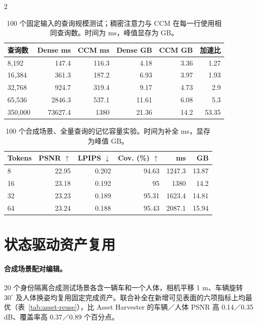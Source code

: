 \begin{multicols}{2}
\begin{table}[H]
\centering\small
\setlength{\tabcolsep}{3pt}
\caption{100 个固定输入的查询规模测试；稠密注意力与 CCM 在每一行使用相同查询数。时间为 ms，峰值显存为 GB。}
\label{tab:attention-scaling}
\begin{tabular}{@{}lrrrrr@{}}
\toprule
查询数 & Dense ms & CCM ms & Dense GB & CCM GB & 加速比 \\
\midrule
8,192 & 147.4 & 116.3 & 4.18 & 3.36 & 1.27 \\
16,384 & 361.3 & 187.2 & 6.93 & 3.97 & 1.93 \\
32,768 & 924.7 & 319.4 & 9.17 & 4.73 & 2.9 \\
65,536 & 2846.3 & 537.1 & 11.61 & 6.08 & 5.3 \\
350,000 & 73627.4 & 1380 & 21.36 & 14.2 & 53.35 \\
\bottomrule
\end{tabular}
\end{table}

\begin{table}[H]
\centering\small
\setlength{\tabcolsep}{4pt}
\caption{100 个合成场景、全量查询的记忆容量实验。时间为补全 ms，显存为峰值 GB。}
\label{tab:memory-capacity}
\begin{tabular}{@{}lrrrrr@{}}
\toprule
Tokens & PSNR $\uparrow$ & LPIPS $\downarrow$ & Cov. (\%) $\uparrow$ & ms & GB \\
\midrule
8 & 22.95 & 0.202 & 94.63 & 1247.3 & 13.87 \\
16 & 23.18 & 0.192 & 95 & 1380 & 14.2 \\
32 & 23.23 & 0.189 & 95.31 & 1623.4 & 14.81 \\
64 & 23.24 & 0.188 & 95.43 & 2087.1 & 15.94 \\
\bottomrule
\end{tabular}
\end{table}

\section{状态驱动资产复用}
\label{sec:supp-reuse}

\paragraph{合成场景配对编辑。}
20 个身份隔离合成测试场景各含一辆车和一个人体，相机平移 1 m、车辆旋转 $30^\circ$ 及人体换姿均复用固定完成资产。联合补全在新增可见表面的六项指标上均最优（表~\ref{tab:asset-reuse}），比 Asset Harvester 的车辆／人体 PSNR 高 0.14／0.35 dB、覆盖率高 0.37／0.89 个百分点。

\end{multicols}
